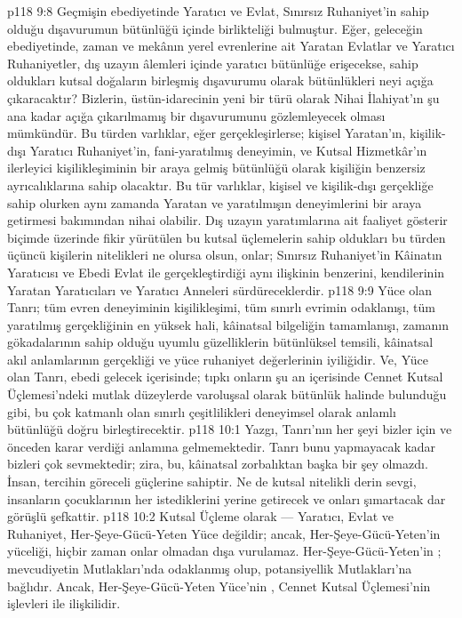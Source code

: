 \vs p118 9:8 Geçmişin ebediyetinde Yaratıcı ve Evlat, Sınırsız Ruhaniyet’in sahip olduğu dışavurumun bütünlüğü içinde birlikteliği bulmuştur. Eğer, geleceğin ebediyetinde, zaman ve mekânın yerel evrenlerine ait Yaratan Evlatlar ve Yaratıcı Ruhaniyetler, dış uzayın âlemleri içinde yaratıcı bütünlüğe erişecekse, sahip oldukları kutsal doğaların birleşmiş dışavurumu olarak bütünlükleri neyi açığa çıkaracaktır? Bizlerin, üstün\hyp{}idarecinin yeni bir türü olarak Nihai İlahiyat’ın şu ana kadar açığa çıkarılmamış bir dışavurumunu gözlemleyecek olması mümkündür. Bu türden varlıklar, eğer gerçekleşirlerse; kişisel Yaratan’ın, kişilik\hyp{}dışı Yaratıcı Ruhaniyet’in, fani\hyp{}yaratılmış deneyimin, ve Kutsal Hizmetkâr’ın ilerleyici kişilikleşiminin bir araya gelmiş bütünlüğü olarak kişiliğin benzersiz ayrıcalıklarına sahip olacaktır. Bu tür varlıklar, kişisel ve kişilik\hyp{}dışı gerçekliğe sahip olurken aynı zamanda Yaratan ve yaratılmışın deneyimlerini bir araya getirmesi bakımından nihai olabilir. Dış uzayın yaratımlarına ait faaliyet gösterir biçimde üzerinde fikir yürütülen bu kutsal üçlemelerin sahip oldukları bu türden üçüncü kişilerin nitelikleri ne olursa olsun, onlar; Sınırsız Ruhaniyet’in Kâinatın Yaratıcısı ve Ebedi Evlat ile gerçekleştirdiği aynı ilişkinin benzerini, kendilerinin Yaratan Yaratıcıları ve Yaratıcı Anneleri sürdüreceklerdir.
\vs p118 9:9 Yüce olan Tanrı; tüm evren deneyiminin kişilikleşimi, tüm sınırlı evrimin odaklanışı, tüm yaratılmış gerçekliğinin en yüksek hali, kâinatsal bilgeliğin tamamlanışı, zamanın gökadalarının sahip olduğu uyumlu güzelliklerin bütünlüksel temsili, kâinatsal akıl anlamlarının gerçekliği ve yüce ruhaniyet değerlerinin iyiliğidir. Ve, Yüce olan Tanrı, ebedi gelecek içerisinde; tıpkı onların şu an içerisinde Cennet Kutsal Üçlemesi’ndeki mutlak düzeylerde varoluşsal olarak bütünlük halinde bulunduğu gibi, bu çok katmanlı olan sınırlı çeşitlilikleri deneyimsel olarak anlamlı bütünlüğü doğru birleştirecektir.
\vs p118 10:1 Yazgı, Tanrı’nın her şeyi bizler için ve önceden karar verdiği anlamına gelmemektedir. Tanrı bunu yapmayacak kadar bizleri çok sevmektedir; zira, bu, kâinatsal zorbalıktan başka bir şey olmazdı. İnsan, tercihin göreceli güçlerine sahiptir. Ne de kutsal nitelikli derin sevgi, insanların çocuklarının her istediklerini yerine getirecek ve onları şımartacak dar görüşlü şefkattir.
\vs p118 10:2 Kutsal Üçleme olarak --- Yaratıcı, Evlat ve Ruhaniyet, Her\hyp{}Şeye\hyp{}Gücü\hyp{}Yeten Yüce değildir; ancak, Her\hyp{}Şeye\hyp{}Gücü\hyp{}Yeten’in yüceliği, hiçbir zaman onlar olmadan dışa vurulamaz. Her\hyp{}Şeye\hyp{}Gücü\hyp{}Yeten’in ; mevcudiyetin Mutlakları’nda odaklanmış olup, potansiyellik Mutlakları’na bağlıdır. Ancak, Her\hyp{}Şeye\hyp{}Gücü\hyp{}Yeten Yüce’nin , Cennet Kutsal Üçlemesi’nin işlevleri ile ilişkilidir.
